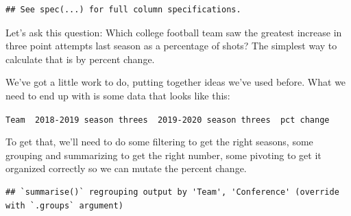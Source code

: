\documentclass[
]{book}
\newenvironment{Shaded}{\begin{snugshade}}{\end{snugshade}}
\newcommand{\CommentTok}[1]{\textcolor[rgb]{0.56,0.35,0.01}{\textit{#1}}}
\newcommand{\DataTypeTok}[1]{\textcolor[rgb]{0.13,0.29,0.53}{#1}}
\newcommand{\DecValTok}[1]{\textcolor[rgb]{0.00,0.00,0.81}{#1}}
\newcommand{\KeywordTok}[1]{\textcolor[rgb]{0.13,0.29,0.53}{\textbf{#1}}}
\newcommand{\NormalTok}[1]{#1}
\newcommand{\OperatorTok}[1]{\textcolor[rgb]{0.81,0.36,0.00}{\textbf{#1}}}
\newcommand{\StringTok}[1]{\textcolor[rgb]{0.31,0.60,0.02}{#1}}
\begin{document}
\begin{verbatim}
## See spec(...) for full column specifications.
\end{verbatim}

Let's ask this question: Which college football team saw the greatest increase in three point attempts last season as a percentage of shots? The simplest way to calculate that is by percent change.

We've got a little work to do, putting together ideas we've used before. What we need to end up with is some data that looks like this:

\texttt{Team\ \textbar{}\ 2018-2019\ season\ threes\ \textbar{}\ 2019-2020\ season\ threes\ \textbar{}\ pct\ change}

To get that, we'll need to do some filtering to get the right seasons, some grouping and summarizing to get the right number, some pivoting to get it organized correctly so we can mutate the percent change.

\begin{Shaded}
\end{Shaded}

\begin{verbatim}
## `summarise()` regrouping output by 'Team', 'Conference' (override with `.groups` argument)
\end{verbatim}
\end{document}
